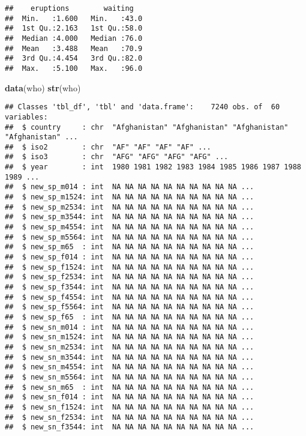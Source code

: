 \documentclass[]{article}
\newenvironment{Shaded}{\begin{snugshade}}{\end{snugshade}}
\newcommand{\KeywordTok}[1]{\textcolor[rgb]{0.13,0.29,0.53}{\textbf{#1}}}
\newcommand{\NormalTok}[1]{#1}
\begin{document}
\begin{verbatim}
##    eruptions        waiting    
##  Min.   :1.600   Min.   :43.0  
##  1st Qu.:2.163   1st Qu.:58.0  
##  Median :4.000   Median :76.0  
##  Mean   :3.488   Mean   :70.9  
##  3rd Qu.:4.454   3rd Qu.:82.0  
##  Max.   :5.100   Max.   :96.0
\end{verbatim}

\begin{Shaded}
\begin{Highlighting}[]
\KeywordTok{data}\NormalTok{(who)}
\KeywordTok{str}\NormalTok{(who)}
\end{Highlighting}
\end{Shaded}

\begin{verbatim}
## Classes 'tbl_df', 'tbl' and 'data.frame':    7240 obs. of  60 variables:
##  $ country     : chr  "Afghanistan" "Afghanistan" "Afghanistan" "Afghanistan" ...
##  $ iso2        : chr  "AF" "AF" "AF" "AF" ...
##  $ iso3        : chr  "AFG" "AFG" "AFG" "AFG" ...
##  $ year        : int  1980 1981 1982 1983 1984 1985 1986 1987 1988 1989 ...
##  $ new_sp_m014 : int  NA NA NA NA NA NA NA NA NA NA ...
##  $ new_sp_m1524: int  NA NA NA NA NA NA NA NA NA NA ...
##  $ new_sp_m2534: int  NA NA NA NA NA NA NA NA NA NA ...
##  $ new_sp_m3544: int  NA NA NA NA NA NA NA NA NA NA ...
##  $ new_sp_m4554: int  NA NA NA NA NA NA NA NA NA NA ...
##  $ new_sp_m5564: int  NA NA NA NA NA NA NA NA NA NA ...
##  $ new_sp_m65  : int  NA NA NA NA NA NA NA NA NA NA ...
##  $ new_sp_f014 : int  NA NA NA NA NA NA NA NA NA NA ...
##  $ new_sp_f1524: int  NA NA NA NA NA NA NA NA NA NA ...
##  $ new_sp_f2534: int  NA NA NA NA NA NA NA NA NA NA ...
##  $ new_sp_f3544: int  NA NA NA NA NA NA NA NA NA NA ...
##  $ new_sp_f4554: int  NA NA NA NA NA NA NA NA NA NA ...
##  $ new_sp_f5564: int  NA NA NA NA NA NA NA NA NA NA ...
##  $ new_sp_f65  : int  NA NA NA NA NA NA NA NA NA NA ...
##  $ new_sn_m014 : int  NA NA NA NA NA NA NA NA NA NA ...
##  $ new_sn_m1524: int  NA NA NA NA NA NA NA NA NA NA ...
##  $ new_sn_m2534: int  NA NA NA NA NA NA NA NA NA NA ...
##  $ new_sn_m3544: int  NA NA NA NA NA NA NA NA NA NA ...
##  $ new_sn_m4554: int  NA NA NA NA NA NA NA NA NA NA ...
##  $ new_sn_m5564: int  NA NA NA NA NA NA NA NA NA NA ...
##  $ new_sn_m65  : int  NA NA NA NA NA NA NA NA NA NA ...
##  $ new_sn_f014 : int  NA NA NA NA NA NA NA NA NA NA ...
##  $ new_sn_f1524: int  NA NA NA NA NA NA NA NA NA NA ...
##  $ new_sn_f2534: int  NA NA NA NA NA NA NA NA NA NA ...
##  $ new_sn_f3544: int  NA NA NA NA NA NA NA NA NA NA ...

\end{verbatim}
\end{document}
